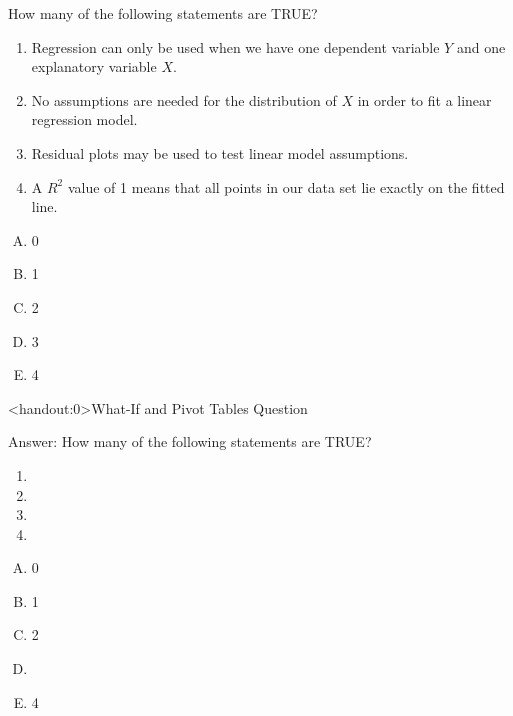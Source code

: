 \documentclass[xcolor=svgnames, handout]{beamer}
\begin{document}
\begin{frame}
  \begin{example}
 How many of the following statements are TRUE?
 \begin{enumerate}
\item Regression can only be used when we have one dependent variable $Y$ and one explanatory variable $X$.
\item No assumptions are needed for the distribution of $X$ in order to fit a linear regression model.
\item Residual plots may be used to test linear model assumptions.
\item A $R^2$ value of 1 means that all points in our data set lie exactly on the fitted line.
 \end{enumerate}
\begin{multicols}{5}
\begin{enumerate}[A)]
\item 0 
\item 1
\item 2
\item 3
\item 4
\end{enumerate}
\end{multicols}
  \end{example} 
\end{frame}

\begin{frame}<handout:0>{What-If and Pivot Tables Question}
  \begin{block}{Answer:}
 How many of the following statements are TRUE?
 \begin{enumerate}
\item {}
\item {}
\item {}
\item {}
 \end{enumerate}
\begin{multicols}{5}
\begin{enumerate}[A)]
\item 0 
\item 1
\item 2
\item \textbf<4>{\textit<4>{{}}}
\item 4
\end{enumerate}
\end{multicols}
  \end{block} 
\end{frame}
\end{document}
